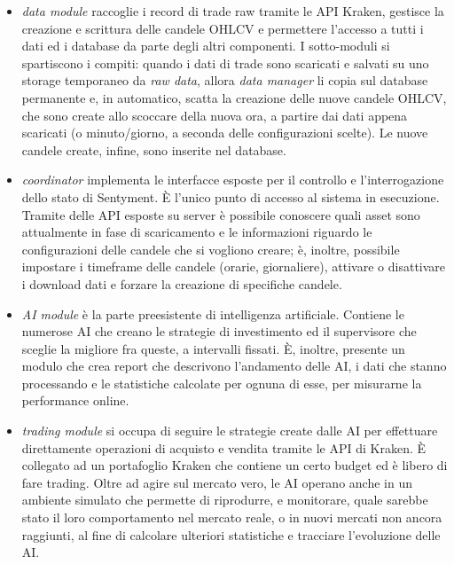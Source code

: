 \documentclass[a4paper,12pt]{report}
\begin{document}
\begin{itemize}
	\item \textit{data module} raccoglie i record di trade raw tramite le API Kraken, gestisce la creazione e scrittura delle candele OHLCV e permettere l'accesso a tutti i dati ed i database da parte degli altri componenti. I sotto-moduli si spartiscono i compiti: quando i dati di trade sono scaricati e salvati su uno storage temporaneo da \textit{raw data}, allora \textit{data manager} li copia sul database permanente e, in automatico, scatta la creazione delle nuove candele OHLCV, che sono create allo scoccare della nuova ora, a partire dai dati appena scaricati (o minuto/giorno, a seconda delle configurazioni scelte). Le nuove candele create, infine, sono inserite nel database.
	\item \textit{coordinator} implementa le interfacce esposte per il controllo e l'interrogazione dello stato di Sentyment. È l'unico punto di accesso al sistema in esecuzione. Tramite delle API esposte su server è possibile conoscere quali asset sono attualmente in fase di scaricamento e le informazioni riguardo le configurazioni delle candele che si vogliono creare; è, inoltre, possibile impostare i timeframe delle candele (orarie, giornaliere), attivare o disattivare i download dati e forzare la creazione di specifiche candele.
	\item \textit{AI module} è la parte preesistente di intelligenza artificiale. Contiene le numerose AI che creano le strategie di investimento ed il supervisore che sceglie la migliore fra queste, a intervalli fissati. È, inoltre, presente un modulo che crea report che descrivono l'andamento delle AI, i dati che stanno processando e le statistiche calcolate per ognuna di esse, per misurarne la performance online.
	\item \textit{trading module} si occupa di seguire le strategie create dalle AI per effettuare direttamente operazioni di acquisto e vendita tramite le API di Kraken. È collegato ad un portafoglio Kraken che contiene un certo budget ed è libero di fare trading. Oltre ad agire sul mercato vero, le AI operano anche in un ambiente simulato che permette di riprodurre, e monitorare, quale sarebbe stato il loro comportamento nel mercato reale, o in nuovi mercati non ancora raggiunti, al fine di calcolare ulteriori statistiche e tracciare l'evoluzione delle AI.
\end{itemize}
\end{document}
